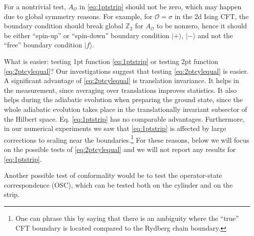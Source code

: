 \documentclass[a4paper,11pt]{article}
\theoremstyle{remark}
\theoremstyle{theorem}
\begin{document}
For a nontrivial test, $A_{\mathcal{O}}$ in \eqref{eq:1ptstrip} should not be
zero, which may happen due to global symmetry reasons. For example, for
$\mathcal{O}= \sigma$ in the 2d Ising CFT, the boundary condition should break
global $\mathbb{Z}_2$ for $A_{\mathcal{O}}$ to be nonzero, hence it should be
either ``spin-up'' or ``spin-down'' boundary condition $| + \rangle$, $| -
\rangle$ and not the ``free'' boundary condition $|f \rangle$.

What is easier: testing 1pt function \eqref{eq:1ptstrip} or testing 2pt
function \eqref{eq:2ptcylequal}? Our investigations suggest that testing
\eqref{eq:2ptcylequal} is easier. A significant advantage of
\eqref{eq:2ptcylequal} is translation invariance. It helps in the measurement,
since averaging over translations improves statistics. It also helps during
the adiabatic evolution when preparing the ground state, since the whole
adiabatic evolution takes place in the translationally invariant subsector of
the Hilbert space. Eq. \eqref{eq:1ptstrip} has no comparable advantages.
Furthermore, in our numerical experiments we saw that \eqref{eq:1ptstrip} is affected by
large corrections to scaling near the boundaries.\footnote{One can phrase this
	by saying that there is an ambiguity where the ``true'' CFT boundary is
	located compared to the Rydberg chain boundary.} For these reasons, below we
will focus on the possible tests of \eqref{eq:2ptcylequal} and we will not
report any results for \eqref{eq:1ptstrip}.

 Another possible test of conformality would be to test
the operator-state correspondence (OSC), which can be tested both on the
cylinder and on the strip.
\end{document}
